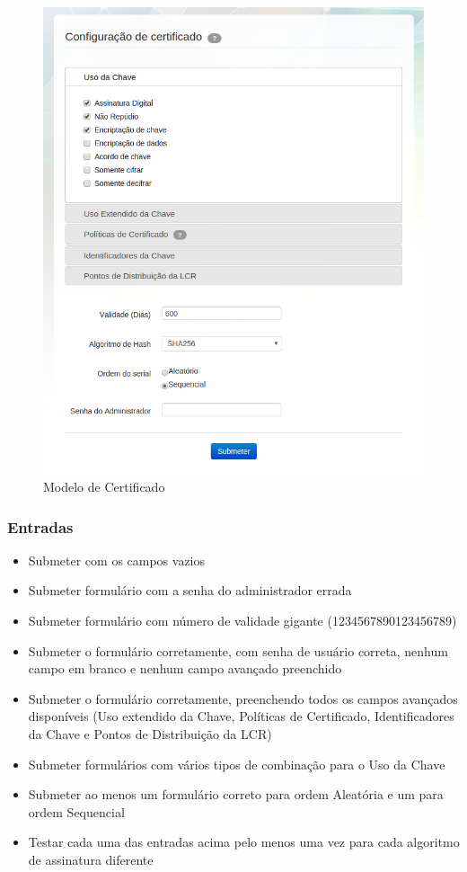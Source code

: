 \begin{figure}[ht]
     \centering
     \includegraphics[scale=0.5]{images/certmodel21.png}
     \caption{Modelo de Certificado}
     \label{fig:modelocert}
\end{figure}

\subsubsection{Entradas}
\begin{itemize}
	\item Submeter com os campos vazios 
	\item Submeter formulário com a senha do administrador errada
	\item Submeter formulário com número de validade gigante (1234567890123456789)
	\item Submeter o formulário corretamente, com senha de usuário correta, nenhum campo em branco e nenhum campo avançado preenchido
	\item Submeter o formulário corretamente, preenchendo todos os campos avançados disponíveis (Uso extendido da Chave, Políticas de Certificado,  Identificadores da Chave e Pontos de Distribuição da LCR)
	\item Submeter formulários com vários tipos de combinação para o Uso da Chave
	\item Submeter ao menos um formulário correto para ordem Aleatória e um para ordem Sequencial
	\item Testar cada uma das entradas acima pelo menos uma vez para cada algoritmo de assinatura diferente
\end{itemize}


